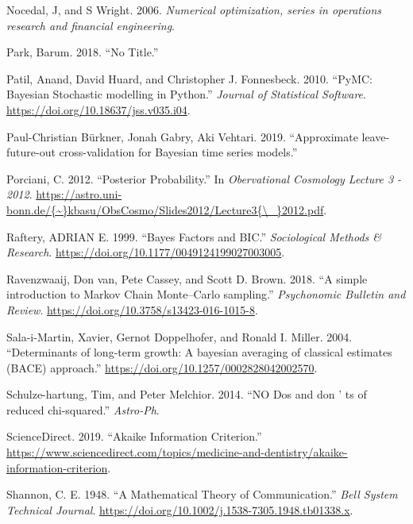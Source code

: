 \documentclass[12pt,]{article}
\begin{document}
\leavevmode\hypertarget{ref-Nocedal2006}{}%
Nocedal, J, and S Wright. 2006. \emph{Numerical optimization, series in operations research and financial engineering}.

\leavevmode\hypertarget{ref-Park2018}{}%
Park, Barum. 2018. ``No Title.''

\leavevmode\hypertarget{ref-Patil2010}{}%
Patil, Anand, David Huard, and Christopher J. Fonnesbeck. 2010. ``PyMC: Bayesian Stochastic modelling in Python.'' \emph{Journal of Statistical Software}. \url{https://doi.org/10.18637/jss.v035.i04}.

\leavevmode\hypertarget{ref-Burkner2019}{}%
Paul-Christian Bürkner, Jonah Gabry, Aki Vehtari. 2019. ``Approximate leave-future-out cross-validation for Bayesian time series models.''

\leavevmode\hypertarget{ref-Porciani2012}{}%
Porciani, C. 2012. ``Posterior Probability.'' In \emph{Obervational Cosmology Lecture 3 - 2012}. \href{https://astro.uni-bonn.de/\%7B~\%7Dkbasu/ObsCosmo/Slides2012/Lecture3\%7B/_\%7D2012.pdf}{https://astro.uni-bonn.de/\{\textasciitilde{}\}kbasu/ObsCosmo/Slides2012/Lecture3\{\textbackslash{}\_\}2012.pdf}.

\leavevmode\hypertarget{ref-RAFTERY1999}{}%
Raftery, ADRIAN E. 1999. ``Bayes Factors and BIC.'' \emph{Sociological Methods \& Research}. \url{https://doi.org/10.1177/0049124199027003005}.

\leavevmode\hypertarget{ref-VanRavenzwaaij2018}{}%
Ravenzwaaij, Don van, Pete Cassey, and Scott D. Brown. 2018. ``A simple introduction to Markov Chain Monte--Carlo sampling.'' \emph{Psychonomic Bulletin and Review}. \url{https://doi.org/10.3758/s13423-016-1015-8}.

\leavevmode\hypertarget{ref-Sala-i-Martin2004}{}%
Sala-i-Martin, Xavier, Gernot Doppelhofer, and Ronald I. Miller. 2004. ``Determinants of long-term growth: A bayesian averaging of classical estimates (BACE) approach.'' \url{https://doi.org/10.1257/0002828042002570}.

\leavevmode\hypertarget{ref-Schulze-hartung2014}{}%
Schulze-hartung, Tim, and Peter Melchior. 2014. ``NO Dos and don ' ts of reduced chi-squared.'' \emph{Astro-Ph}.

\leavevmode\hypertarget{ref-ScienceDirect2019}{}%
ScienceDirect. 2019. ``Akaike Information Criterion.'' \url{https://www.sciencedirect.com/topics/medicine-and-dentistry/akaike-information-criterion}.

\leavevmode\hypertarget{ref-Shannon1948}{}%
Shannon, C. E. 1948. ``A Mathematical Theory of Communication.'' \emph{Bell System Technical Journal}. \url{https://doi.org/10.1002/j.1538-7305.1948.tb01338.x}.
\end{document}
